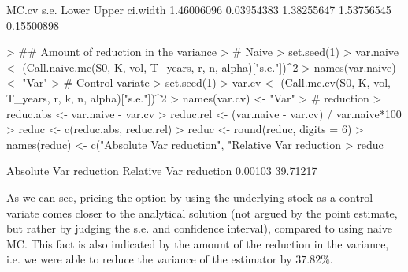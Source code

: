 \documentclass{article}
\begin{document}
\begin{Schunk}
\begin{Soutput}
     MC.cv       s.e.      Lower      Upper   ci.width 
1.46006096 0.03954383 1.38255647 1.53756545 0.15500898 
\end{Soutput}
\begin{Sinput}
> ## Amount of reduction in the variance
> # Naive
> set.seed(1)
> var.naive <- (Call.naive.mc(S0, K, vol, T_years, r, n, alpha)["s.e."])^2
> names(var.naive) <- "Var"
> # Control variate
> set.seed(1)
> var.cv <- (Call.mc.cv(S0, K, vol, T_years, r, k, n, alpha)["s.e."])^2
> names(var.cv) <- "Var"
> # reduction
> reduc.abs <- var.naive - var.cv
> reduc.rel <- (var.naive - var.cv) / var.naive*100
> reduc <- c(reduc.abs, reduc.rel)
> reduc  <- round(reduc, digits = 6)
> names(reduc) <- c("Absolute Var reduction", "Relative Var reduction %
> reduc
\end{Sinput}
\begin{Soutput}
  Absolute Var reduction Relative Var reduction %
                 0.00103                 39.71217 
\end{Soutput}
\end{Schunk}
As we can see, pricing the option by using the underlying stock as a control variate comes closer to the analytical solution (not argued by the point estimate, but rather by judging the s.e. and confidence interval), compared to using naive MC. This fact is also indicated by the amount of the reduction in the variance, i.e. we were able to reduce the variance of the estimator by $37.82\%$.\\
\end{document}

